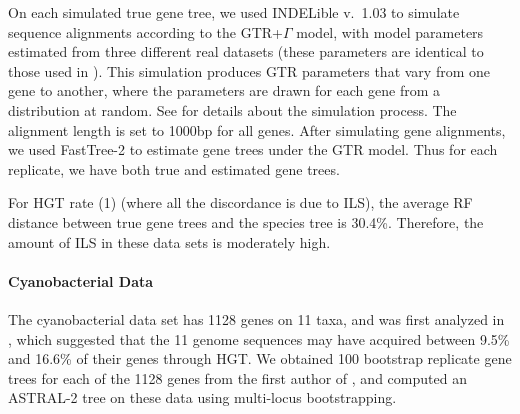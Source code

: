 
On each simulated true gene tree, we used INDELible
 \cite{Indelible} v.~1.03  to simulate sequence alignments according to the GTR+$\Gamma$ model,  with model parameters estimated from three different real datasets (these parameters are identical to those 
used in \cite{Astral2}). 
This simulation  produces 
GTR parameters that vary from one gene to another,
where the parameters are drawn for each gene from a distribution at random. 
See \cite{Astral2} for details about the simulation process.
The alignment length is set to 1000bp for all genes. 
After simulating gene alignments, we used FastTree-2 \cite{FastTree2} to estimate gene trees under the GTR model.  Thus for each replicate, we have both true and estimated gene trees.  

For HGT rate (1) (where all the discordance is due to ILS), 
the average RF \cite{RF} distance between 
true gene trees and the species tree is 30.4\%.  
Therefore, the amount of ILS in these data sets is moderately high. 




\paragraph{Cyanobacterial Data}\label{hgt::}

The cyanobacterial data set has
1128 genes on 11 taxa, and was first analyzed in \cite{Cyanobacteria}, which 
suggested that the 11 genome sequences may 
have acquired between 9.5\% and 16.6\% of their genes through HGT.  
We obtained 100 bootstrap replicate gene trees
for each of the 1128 genes from the first author of \cite{BansalHGTProkaryotes}, and computed
an ASTRAL-2 tree on these data using multi-locus bootstrapping.



